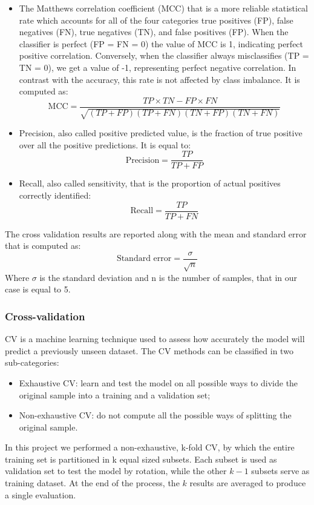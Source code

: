 \documentclass[nocrop]{bioinfo}
\begin{document}
\begin{methods}
\begin{itemize}
\item The Matthews correlation coefficient (MCC) that is a more reliable statistical rate which accounts for all of the four categories true positives (FP), false negatives (FN), true negatives (TN), and false positives (FP). When the classifier is perfect (FP = FN = 0) the value of MCC is 1, indicating perfect positive correlation. Conversely, when the classifier always misclassifies (TP = TN = 0), we get a value of -1, representing perfect negative correlation. In contrast with the accuracy, this rate is not affected by class imbalance. It is computed as:
\begin{equation}
    \text{MCC} = \frac{TP \times TN - FP \times FN}{\sqrt{(TP+FP)(TP+FN)(TN+FP)(TN+FN)}}
\end{equation}

\item Precision, also called positive predicted value, is the fraction of true positive over all the positive predictions. It is equal to:
\begin{equation}
    \text{Precision} = \frac{TP}{TP+FP}
\end{equation}

\item Recall, also called sensitivity, that is the proportion of actual positives correctly identified:
\begin{equation}
    \text{Recall} = \frac{TP}{TP+FN}
\end{equation}
\end{itemize}
The cross validation results are reported along with the mean and standard error that is computed as:
\begin{equation}
	\text{Standard error} = \frac{\sigma}{\sqrt{n}}
\end{equation}
Where $\sigma$ is the standard deviation and n is the number of samples, that in our case is equal to 5.
\subsubsection{Cross-validation} 
CV is a machine learning technique used to assess how accurately the model will predict a previously unseen dataset. The CV methods can be classified in two sub-categories:
\begin{itemize}
    \item Exhaustive CV: learn and test the model on all possible ways to divide the original sample into a training and a validation set;
    \item Non-exhaustive CV: do not compute all the possible ways of splitting the original sample.
\end{itemize}
In this project we performed a non-exhaustive, k-fold CV, by which the entire training set is partitioned in k equal sized subsets. Each subset is used as validation set to test the model by rotation, while the other $k-1$ subsets serve as training dataset. At the end of the process, the $k$ results are averaged to produce a single evaluation.

\end{methods}
\end{document}
